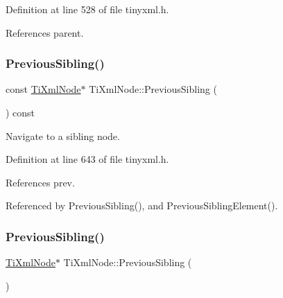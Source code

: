 Definition at line 528 of file tinyxml.\+h.



References parent.

\hypertarget{class_ti_xml_node_a8aacf06b1a577ff0d7cfa502cc76da32}{}\label{class_ti_xml_node_a8aacf06b1a577ff0d7cfa502cc76da32} 
\subsubsection{\texorpdfstring{Previous\+Sibling()}{PreviousSibling()}\hspace{0.1cm}{\footnotesize\ttfamily [1/6]}}
{\footnotesize\ttfamily const \hyperlink{class_ti_xml_node}{Ti\+Xml\+Node}$\ast$ Ti\+Xml\+Node\+::\+Previous\+Sibling (\begin{DoxyParamCaption}{ }\end{DoxyParamCaption}) const\hspace{0.3cm}{\ttfamily [inline]}}



Navigate to a sibling node. 



Definition at line 643 of file tinyxml.\+h.



References prev.



Referenced by Previous\+Sibling(), and Previous\+Sibling\+Element().

\hypertarget{class_ti_xml_node_af8c0642ad6ecc03f62953e68896ed1cc}{}\label{class_ti_xml_node_af8c0642ad6ecc03f62953e68896ed1cc} 
\subsubsection{\texorpdfstring{Previous\+Sibling()}{PreviousSibling()}\hspace{0.1cm}{\footnotesize\ttfamily [2/6]}}
{\footnotesize\ttfamily \hyperlink{class_ti_xml_node}{Ti\+Xml\+Node}$\ast$ Ti\+Xml\+Node\+::\+Previous\+Sibling (\begin{DoxyParamCaption}{ }\end{DoxyParamCaption})\hspace{0.3cm}{\ttfamily [inline]}}



